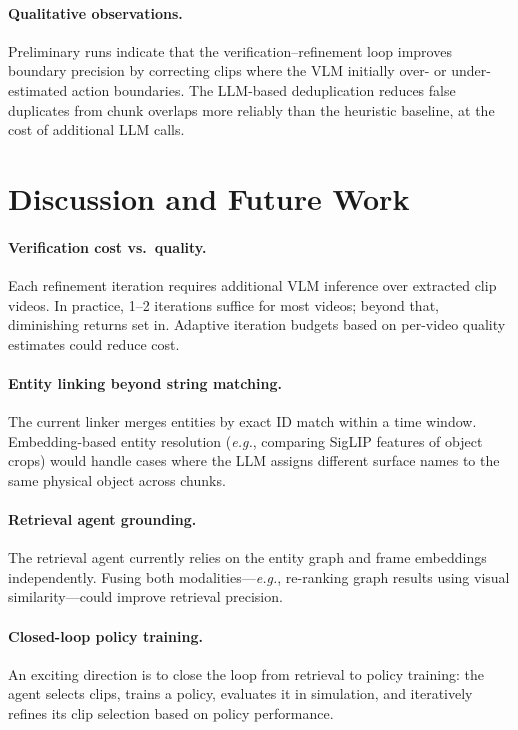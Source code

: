 \documentclass[10pt,twocolumn]{article}
\newcommand{\eg}{\textit{e.g.}}
\begin{document}
\paragraph{Qualitative observations.}
Preliminary runs indicate that the verification--refinement loop
improves boundary precision by correcting clips where the VLM
initially over- or under-estimated action boundaries.
The LLM-based deduplication reduces false duplicates from chunk
overlaps more reliably than the heuristic baseline, at the cost
of additional LLM calls.


\section{Discussion and Future Work}\label{sec:discussion}

\paragraph{Verification cost vs.\ quality.}
Each refinement iteration requires additional VLM inference over
extracted clip videos.  In practice, 1--2 iterations suffice for
most videos; beyond that, diminishing returns set in.
Adaptive iteration budgets based on per-video quality estimates
could reduce cost.

\paragraph{Entity linking beyond string matching.}
The current linker merges entities by exact ID match within a
time window.  Embedding-based entity resolution (\eg, comparing
SigLIP features of object crops) would handle cases where the
LLM assigns different surface names to the same physical object
across chunks.

\paragraph{Retrieval agent grounding.}
The retrieval agent currently relies on the entity graph and
frame embeddings independently.  Fusing both modalities---\eg,
re-ranking graph results using visual similarity---could improve
retrieval precision.

\paragraph{Closed-loop policy training.}
An exciting direction is to close the loop from retrieval to
policy training: the agent selects clips, trains a policy, evaluates
it in simulation, and iteratively refines its clip selection based
on policy performance.
\end{document}
